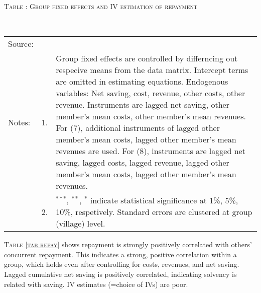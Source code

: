 \hspace{-1cm}\begin{minipage}[t]{14cm}
\hfil\textsc{\normalsize Table \thetable: Group fixed effects and IV estimation of repayment\label{tab repay}}\\
\setlength{\tabcolsep}{1pt}
\setlength{\baselineskip}{8pt}
\renewcommand{\arraystretch}{.6}
\hfil{}\\
\renewcommand{\arraystretch}{.8}
\setlength{\tabcolsep}{1pt}
\begin{tabular}{>{\hfill\scriptsize}p{1cm}<{}>{\hfill\scriptsize}p{.25cm}<{}>{\scriptsize}p{12cm}<{\hfill}}
Source:& \multicolumn{2}{l}{\scriptsize Estimated with GUK administrative data.}\\
Notes: & 1. & Group fixed effects are controlled by differncing out respecive means from the data matrix. Intercept terms are omitted in estimating equations. Endogenous variables: Net saving, cost, revenue, other costs, other revenue. Instruments are lagged net saving, other member's mean costs, other member's mean revenues. For (7), additional instruments of lagged other member's mean costs, lagged other member's mean revenues are used. For (8), instruments are lagged net saving, lagged costs, lagged revenue, lagged other member's mean costs, lagged other member's mean revenues.\\
& 2. & ${}^{***}$, ${}^{**}$, ${}^{*}$ indicate statistical significance at 1\%, 5\%, 10\%, respetively. Standard errors are clustered at group (village) level.
\end{tabular}
\end{minipage}

\begin{palepinkleftbar}
\begin{finding}
\textsc{\small Table \ref{tab repay}} shows repayment is strongly positively correlated with others' concurrent repayment. This indicates a strong, positive correlation within a group, which holds even after controlling for costs, revenues, and net saving. Lagged cumulative net saving is positively correlated, indicating solvency is related with saving. IV estimates (=choice of IVs) are poor.
\end{finding}
\end{palepinkleftbar}


